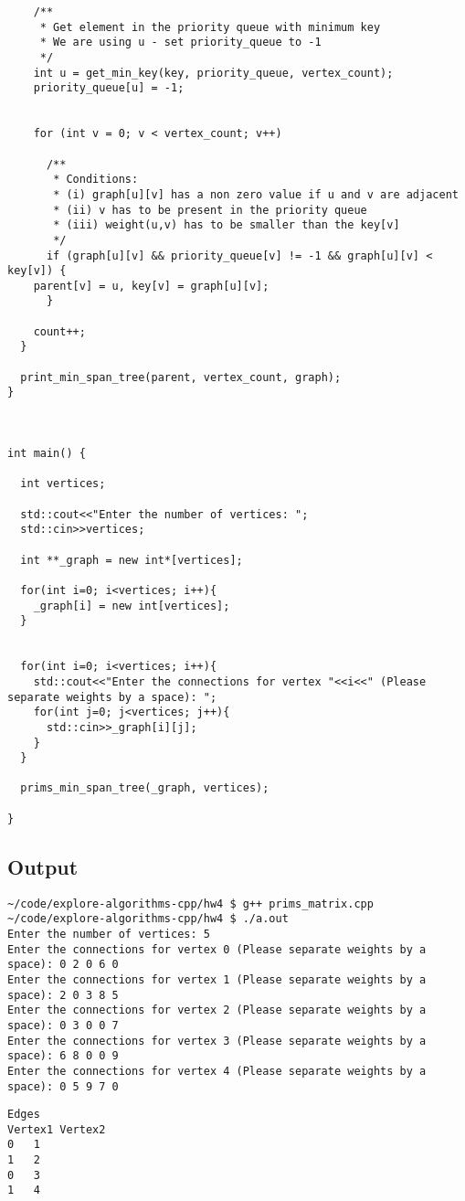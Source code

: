 \documentclass{article}
\begin{document}
\begin{verbatim}
    /**
     * Get element in the priority queue with minimum key
     * We are using u - set priority_queue to -1
     */
    int u = get_min_key(key, priority_queue, vertex_count);
    priority_queue[u] = -1;

  
    for (int v = 0; v < vertex_count; v++)

      /**
       * Conditions:
       * (i) graph[u][v] has a non zero value if u and v are adjacent
       * (ii) v has to be present in the priority queue
       * (iii) weight(u,v) has to be smaller than the key[v]
       */
      if (graph[u][v] && priority_queue[v] != -1 && graph[u][v] < key[v]) {
	parent[v] = u, key[v] = graph[u][v];
      }
	
    count++;
  } 
  
  print_min_span_tree(parent, vertex_count, graph); 
} 
  
  

int main() {

  int vertices;

  std::cout<<"Enter the number of vertices: ";
  std::cin>>vertices;

  int **_graph = new int*[vertices];

  for(int i=0; i<vertices; i++){
    _graph[i] = new int[vertices];
  }

  
  for(int i=0; i<vertices; i++){
    std::cout<<"Enter the connections for vertex "<<i<<" (Please separate weights by a space): ";
    for(int j=0; j<vertices; j++){
      std::cin>>_graph[i][j];
    }
  }
  
  prims_min_span_tree(_graph, vertices); 
  
} 
\end{verbatim}

\subsection{Output}

\begin{verbatim}
~/code/explore-algorithms-cpp/hw4 $ g++ prims_matrix.cpp 
~/code/explore-algorithms-cpp/hw4 $ ./a.out 
Enter the number of vertices: 5
Enter the connections for vertex 0 (Please separate weights by a space): 0 2 0 6 0
Enter the connections for vertex 1 (Please separate weights by a space): 2 0 3 8 5
Enter the connections for vertex 2 (Please separate weights by a space): 0 3 0 0 7
Enter the connections for vertex 3 (Please separate weights by a space): 6 8 0 0 9
Enter the connections for vertex 4 (Please separate weights by a space): 0 5 9 7 0
\end{verbatim}  
\begin{verbatim}
Edges
Vertex1	Vertex2
0	1	
1	2	
0	3	
1	4	
\end{verbatim}  
\end{document}
